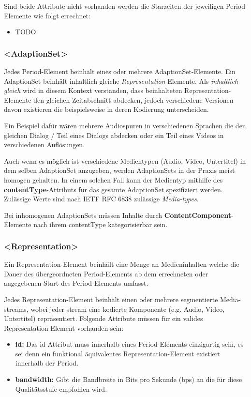 \documentclass[paper = a4, fontsize = 12pt, parskip = half]{scrartcl} %
\begin{document}
Sind beide Attribute nicht vorhanden werden die Starzeiten der jeweiligen Period-Elemente wie folgt errechnet:

\begin{itemize}
    \item TODO
\end{itemize}

\subsubsection{<AdaptionSet>}
Jedes Period-Element beinhält eines oder mehrere AdaptionSet-Elemente. Ein AdaptionSet beinhält inhaltlich gleiche \textit{Representation}-Elemente. Als \textit{inhaltlich gleich} wird in diesem Kontext verstanden, dass beinhalteten Representation-Elemente den gleichen Zeitabschnitt abdecken, jedoch verschiedene Versionen davon existieren die beispielsweise in deren Kodierung unterscheiden.

Ein Beispiel dafür wären mehrere Audiospuren in verschiedenen Sprachen die den gleichen Dialog / Teil eines Dialogs abdecken oder ein Teil eines Videos in verschiedenen Auflösungen.

Auch wenn es möglich ist verschiedene Medientypen (Audio, Video, Untertitel) in dem selben AdaptionSet anzugeben, werden AdaptionSets in der Praxis meist homogen gehalten. In einem solchen Fall kann der Medientyp mithilfe des \textbf{contentType}-Attributs für das gesamte AdaptionSet spezifiziert werden. Zulässige Werte sind nach IETF RFC 6838 zulässige \textit{Media-types}.

Bei inhomogenen AdaptionSets müssen Inhalte durch \textbf{ContentComponent}-Elemente nach ihrem contentType kategorisierbar sein.

\subsubsection{<Representation>}
Ein Representation-Element beinhält eine Menge an Medieninhalten welche die Dauer des übergeordneten Period-Elements ab dem errechneten oder angegebenen Start des Period-Elements umfasst. 

Jedes Representation-Element beinhält einen oder mehrere segmentierte Media-streams, wobei jeder stream eine kodierte Komponente (e.g. Audio, Video, Untertitel) repräsentiert. Folgende Attribute müssen für ein valides Representation-Element vorhanden sein:

\begin{itemize}
    \item \textbf{id:} Das id-Attribut muss innerhalb eines Period-Elements einzigartig sein, es sei denn ein funktional äquivalentes Representation-Element existiert innerhalb der Period.
    \item \textbf{bandwidth:} Gibt die Bandbreite in Bits pro Sekunde (bps) an die für diese Qualitätsstufe empfohlen wird.
\end{itemize}
\end{document}

